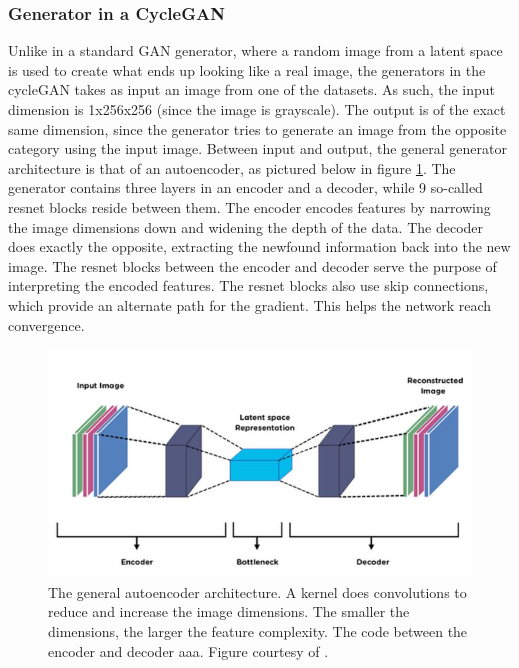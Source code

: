\documentclass[12pt, fleqn, titlepage]{article}
\begin{document}
\subsubsection{Generator in a CycleGAN}
Unlike in a standard GAN generator, where a random image from a latent space is used to create what ends up looking like a real image, the generators in the cycleGAN takes as input an image from one of the datasets. As such, the input dimension is 1x256x256 (since the image is grayscale). The output is of the exact same dimension, since the generator tries to generate an image from the opposite category using the input image. Between input and output, the general generator architecture is that of an autoencoder, as pictured below in figure \ref{fig:autoencoder}. The generator contains three layers in an encoder and a decoder, while 9 so-called resnet blocks reside between them. The encoder encodes features by narrowing the image dimensions down and widening the depth of the data. The decoder does exactly the opposite, extracting the newfound information back into the new image. The resnet blocks between the encoder and decoder serve the purpose of interpreting the encoded features. The resnet blocks also use skip connections, which provide an alternate path for the gradient. This helps the network reach convergence.

\begin{figure}[H]
	\centering
	\includegraphics[width=0.7\linewidth]{imgs/autoencoder}
	\caption{The general autoencoder architecture. A kernel does convolutions to reduce and increase the image dimensions. The smaller the dimensions, the larger the feature complexity. The code between the encoder and decoder aaa. Figure courtesy of \cite{autoencoder}.} %
	\label{fig:autoencoder}
\end{figure}
\end{document}
